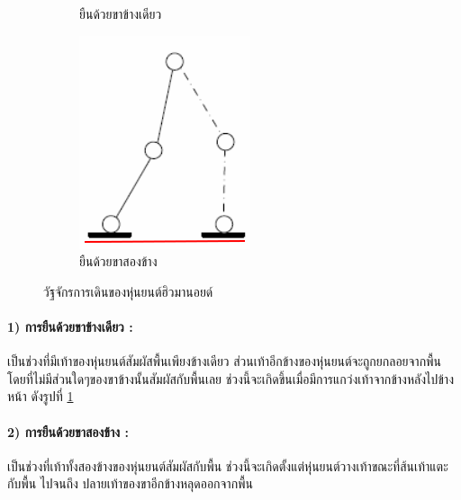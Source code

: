 \begin{figure}[!ht]
\begin{subfigure}[b]{0.45\textwidth}
		\caption{ยืนด้วยขาข้างเดียว}
		\label{fig:robot_walk_2}
	\end{subfigure}
	\hfill
	\begin{subfigure}[b]{0.22\textwidth}
		\centering
		\includegraphics[width=\textwidth]{chapter2/images/doublesupport2.png}
		\caption{ยืนด้วยขาสองข้าง}
		\label{fig:robot_walk_3}
	\end{subfigure}
	\caption{วัฐจักรการเดินของหุ่นยนต์ฮิวมานอยด์}
	\label{fig:robot_walk_phase}
\end{figure}

\clearpage
\paragraph*{1) การยืนด้วยขาข้างเดียว :}
เป็นช่วงที่มีเท้าของหุ่นยนต์สัมผัสพื้นเพียงข้างเดียว ส่วนเท้าอีกข้างของหุ่นยนต์จะถูกยกลอยจากพื้น
โดยที่ไม่มีส่วนใดๆของขาข้างนั้นสัมผัสกับพื้นเลย ช่วงนี้จะเกิดขึ้นเมื่อมีการแกว่งเท้าจากข้างหลังไปข้างหน้า
ดังรูปที่ \ref{fig:robot_walk_2}

\paragraph*{2) การยืนด้วยขาสองข้าง :}
เป็นช่วงที่เท้าทั้งสองข้างของหุ่นยนต์สัมผัสกับพื้น ช่วงนี้จะเกิดตั้งแต่หุ่นยนต์วางเท้าขณะที่ส้นเท้าแตะกับพื้น
ไปจนถึง ปลายเท้าของขาอีกข้างหลุดออกจากพื้น

